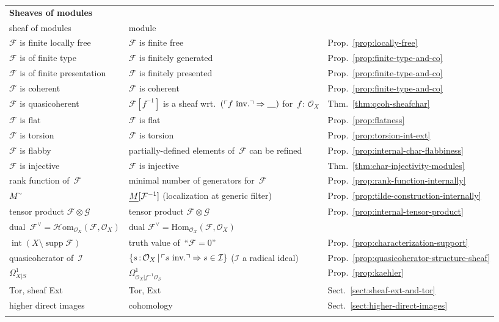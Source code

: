 \documentclass[10pt,reqno,a4paper]{amsbook}
\makeatletter
\theoremstyle{definition}
\theoremstyle{plain}
\theoremstyle{remark}
\newcommand{\F}{\mathcal{F}}
\renewcommand{\G}{\mathcal{G}}
\renewcommand{\O}{\mathcal{O}}
\newcommand{\I}{\mathcal{I}}
\newcommand{\Hom}{\mathrm{Hom}}
\newcommand{\HOM}{\mathcal{H}\mathrm{om}}
\newcommand{\placeholder}{\underline{\quad}}
\let\oldul\ul
\renewcommand{\ul}[1]{\text{\oldul{$#1$}}}
\DeclareMathOperator{\Int}{int}
\DeclareMathOperator{\supp}{supp}
\newcommand{\?}{\,{:}\,}
\renewcommand{\_}{\mathpunct{.}\,}
\newcommand{\speak}[1]{\ulcorner\text{\textnormal{#1}}\urcorner}
\newcommand{\inv}{inv.\@}
\makeatother
\begin{document}
\begin{appendix}
{\begin{longtable}{@{}p{4.4cm}@{\qquad}p{6.7cm}@{\qquad}p{1.5cm}@{}}
  \textbf{Sheaves of modules} \\
  sheaf of modules & module \\
  $\F$ is finite locally free & $\F$ is finite free & Prop.\@~\ref{prop:locally-free} \\
  $\F$ is of finite type & $\F$ is finitely generated & Prop.\@~\ref{prop:finite-type-and-co} \\
  $\F$ is of finite presentation & $\F$ is finitely presented & Prop.\@~\ref{prop:finite-type-and-co} \\
  $\F$ is coherent & $\F$ is coherent & Prop.\@~\ref{prop:finite-type-and-co} \\
  $\F$ is quasicoherent & $\F[f^{-1}]$ is a sheaf wrt.\@~$(\speak{$f$ \inv} \Rightarrow \placeholder)$ for~$f\?\O_X$ & Thm.\@~\ref{thm:qcoh-sheafchar} \\
  $\F$ is flat & $\F$ is flat & Prop.\@~\ref{prop:flatness} \\
  $\F$ is torsion & $\F$ is torsion & Prop.\@~\ref{prop:torsion-int-ext} \\
  $\F$ is flabby & partially-defined elements of~$\F$ can be refined & Prop.\@~\ref{prop:internal-char-flabbiness} \\
  $\F$ is injective & $\F$ is injective & Thm.\@~\ref{thm:char-injectivity-modules} \\
  rank function of~$\F$ & minimal number of generators for~$\F$ & Prop.\@~\ref{prop:rank-function-internally} \\
  $M^\sim$ & $\ul{M}[\F^{-1}]$ (localization at generic filter) & Prop.\@~\ref{prop:tilde-construction-internally} \\
  tensor product $\F \otimes \G$ & tensor product $\F \otimes \G$ & Prop.\@~\ref{prop:internal-tensor-product} \\
  dual~$\F^\vee = \HOM_{\O_X}(\F,\O_X)$ & dual $\F^\vee = \Hom_{\O_X}(\F,\O_X)$ \\
  $\Int(X \setminus \supp\F)$ & truth value of~``$\F = 0$'' & Prop.\@~\ref{prop:characterization-support} \\
  quasicoherator of~$\I$ & $\{ s\?\O_X \,|\, \speak{$s$ \inv}
  \Rightarrow s \in \I \}$ ($\I$ a radical ideal) & Prop.\@~\ref{prop:quasicoherator-structure-sheaf} \\
  $\Omega^1_{X|S}$ & $\Omega^1_{\O_X | f^{-1}\O_S}$ & Prop.\@~\ref{prop:kaehler} \\
  Tor, sheaf Ext & Tor, Ext & Sect.\@~\ref{sect:sheaf-ext-and-tor} \\
  higher direct images & cohomology & Sect.\@~\ref{sect:higher-direct-images} \\\\


\end{longtable}}
\end{appendix}
\end{document}
